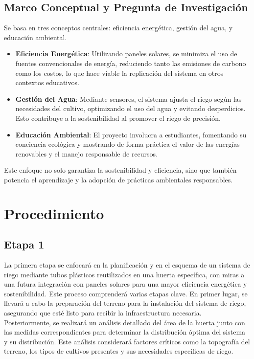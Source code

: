 \documentclass[12pt]{article}
\begin{document}
\subsection*{Marco Conceptual y Pregunta de Investigación}
Se basa en tres conceptos centrales: eficiencia energética, gestión del agua, y educación ambiental.
\begin{itemize}
      \item \textbf{Eficiencia Energética}: Utilizando paneles solares, se minimiza el uso de fuentes convencionales de energía, reduciendo tanto las emisiones de carbono como los costos, lo que hace viable la replicación del sistema en otros contextos educativos.
      \item \textbf{Gestión del Agua}: Mediante sensores, el sistema ajusta el riego según las necesidades del cultivo, optimizando el uso del agua y evitando desperdicios. Esto contribuye a la sostenibilidad al promover el riego de precisión.
      \item \textbf{Educación Ambiental}: El proyecto involucra a estudiantes, fomentando su conciencia ecológica y mostrando de forma práctica el valor de las energías renovables y el manejo responsable de recursos.
\end{itemize}

Este enfoque no solo garantiza la sostenibilidad y eficiencia, sino que también potencia el aprendizaje y la adopción de prácticas ambientales responsables.
\newpage
\section{Procedimiento}

\subsection{Etapa 1}
La primera etapa se enfocará en la planificación y en el esquema de un sistema de riego mediante tubos plásticos reutilizados en una huerta específica, con miras a una futura integración con paneles solares para una mayor eficiencia energética y sostenibilidad. Este proceso comprenderá varias etapas clave. En primer lugar, se llevará a cabo la preparación del terreno para la instalación del sistema de riego, asegurando que esté listo para recibir la infraestructura necesaria. Posteriormente, se realizará un análisis detallado del área de la huerta junto con las medidas correspondientes para determinar la distribución óptima del sistema y su distribución. Este análisis considerará factores críticos como la topografía del terreno, los tipos de cultivos presentes y sus necesidades específicas de riego.
\end{document}

